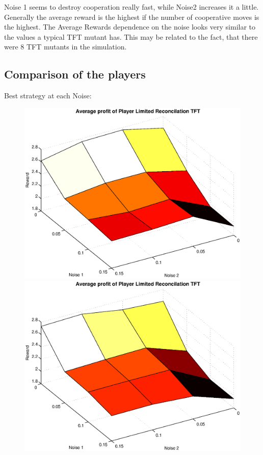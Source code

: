 Noise 1 seems to destroy cooperation really fast, while Noise2 increases it a little. Generally the average reward is the highest if the number of cooperative moves is the highest. The Average Rewards dependence on the noise looks very similar to the values a typical TFT mutant has. This may be related to the fact, that there were 8 TFT mutants in the simulation.

\subsection{Comparison of the players}

Best strategy at each Noise:

\begin{figure}[h]

\begin{minipage}[hbt]{0.65\textwidth}
	\centering
	\includegraphics[width=\textwidth]{pics/simulation1/Reward_vs_Noise_of_Player_Limited_Reconcilation_TFT}
\end{minipage}
\hfill
\begin{minipage}[hbt]{0.3\textwidth}
	\centering
	\includegraphics[width=\textwidth]{pics/simulation2/Reward_vs_Noise_of_Player_Limited_Reconcilation_TFT}

\end{minipage}
\end{figure}
